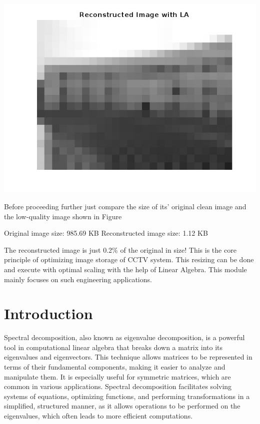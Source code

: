 \documentclass[
  letterpaper,
  DIV=11,
  numbers=noendperiod]{scrreprt}
\newenvironment{Shaded}{\begin{snugshade}}{\end{snugshade}}
\newcommand{\FloatTok}[1]{\textcolor[rgb]{0.68,0.00,0.00}{#1}}
\newcommand{\OperatorTok}[1]{\textcolor[rgb]{0.37,0.37,0.37}{#1}}
\newcommand{\VariableTok}[1]{\textcolor[rgb]{0.07,0.07,0.07}{#1}}
\theoremstyle{plain}
\theoremstyle{definition}
\theoremstyle{remark}
\begin{document}
\includegraphics{gitsRC.jpg}

Before proceeding further just compare the size of its' original clean
image and the low-quality image shown in Figure

\begin{Shaded}
\begin{Highlighting}[]
\VariableTok{Original} \VariableTok{image} \VariableTok{size}\OperatorTok{:} \FloatTok{985.69} \VariableTok{KB}
\VariableTok{Reconstructed} \VariableTok{image} \VariableTok{size}\OperatorTok{:} \FloatTok{1.12} \VariableTok{KB}
\end{Highlighting}
\end{Shaded}

The reconstructed image is just 0.2\% of the original in size! This is
the core principle of optimizing image storage of CCTV system. This
resizing can be done and execute with optimal scaling with the help of
Linear Algebra. This module mainly focuses on such engineering
applications.

\section{Introduction}\label{introduction-2}

Spectral decomposition, also known as eigenvalue decomposition, is a
powerful tool in computational linear algebra that breaks down a matrix
into its eigenvalues and eigenvectors. This technique allows matrices to
be represented in terms of their fundamental components, making it
easier to analyze and manipulate them. It is especially useful for
symmetric matrices, which are common in various applications. Spectral
decomposition facilitates solving systems of equations, optimizing
functions, and performing transformations in a simplified, structured
manner, as it allows operations to be performed on the eigenvalues,
which often leads to more efficient computations.
\end{document}
